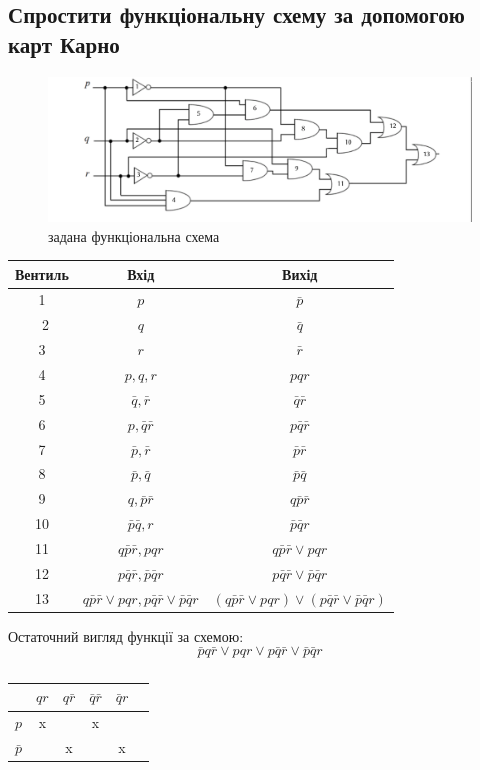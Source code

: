 \documentclass[14pt]{extreport}
\begin{document}
\subsection*{Спростити функціональну схему за допомогою карт Карно}
\begin{figure}[h]
	\includegraphics[width=17cm]{es.png}
	\caption{задана функціональна схема}
\end{figure}
\newpage
\begin{table}[h]
	\centering
\begin{tabular}{ccc}
	Вентиль & Вхід & Вихід \\
	\hline
	1 & $p$ & $\bar p$ \\
	\
	2 & $q$ & $\bar q$ \\
	3 & $r$ & $\bar r$ \\
	4 & $p,q,r$ & $pqr$ \\
	5 & $\bar q, \bar r$ & $\bar q\bar r$ \\
	6 & $p,\bar q\bar r$ & $p\bar q\bar r$ \\
	7 & $\bar p, \bar r$ & $\bar p\bar r$ \\
	8 & $\bar p,\bar q$ & $\bar p\bar q$ \\
	9 & $q,\bar p\bar r$ & $q\bar p\bar r$ \\
	10 & $\bar p\bar q,r$ & $\bar p\bar qr$ \\
	11 & $q\bar p\bar r, pqr$ & $q\bar p\bar r\lor pqr $ \\
	12 & $p\bar q\bar r,\bar p\bar qr$ &
	$p\bar q\bar r\lor\bar p\bar qr$ \\
	13 & $q\bar p\bar r\lor pqr,
	p\bar q\bar r\lor\bar p\bar qr$ &
	$(q\bar p\bar r\lor pqr)
	\lor
	(p\bar q\bar r\lor\bar p\bar qr)$ \\
\end{tabular}
\end{table}

Остаточний вигляд функції за схемою:
$$
	\bar pq\bar r\lor pqr
	\lor
	p\bar q\bar r\lor\bar p\bar qr
$$

\begin{table}[h]
	\centering
\begin{tabular}{|c|c|c|c|c|c|}
	\hline
	& $qr$ & $q\bar r$ & $\bar q\bar r$ & $\bar q r$\\
	\hline
	$p$ & x & & x &\\
	\hline
	$\bar p$ & & x &
	 & x \\
	\hline
\end{tabular}
	\caption{}
\end{table}
\end{document}
